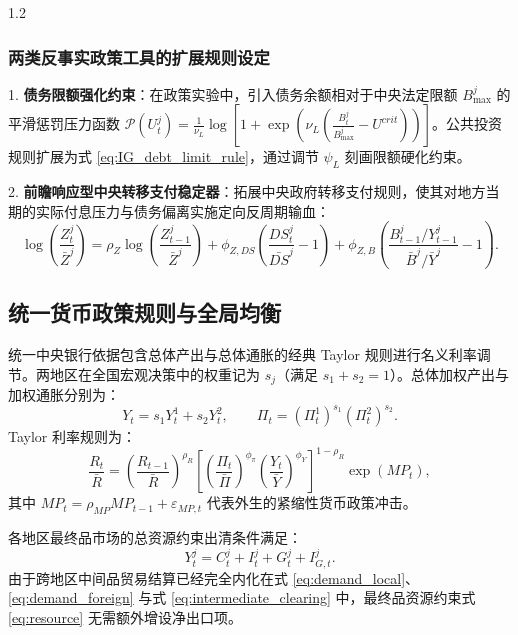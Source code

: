 \documentclass[12pt,UTF8]{ctexart}
\begin{document}
\begin{spacing}{1.2}
		\subsubsection{两类反事实政策工具的扩展规则设定}
		
		1. \textbf{债务限额强化约束}：在政策实验中，引入债务余额相对于中央法定限额 $B_{\max}^j$ 的平滑惩罚压力函数 $\mathcal P(U_t^j) = \frac{1}{\nu_L}\log\left[1+\exp\left(\nu_L(\frac{B_t^j}{B_{\max}^j}-U^{crit})\right)\right]$。公共投资规则扩展为式 \eqref{eq:IG_debt_limit_rule}，通过调节 $\psi_L$ 刻画限额硬化约束。
		
		2. \textbf{前瞻响应型中央转移支付稳定器}：拓展中央政府转移支付规则，使其对地方当期的实际付息压力与债务偏离实施定向反周期输血：
		\begin{equation}
			\log\left(\frac{Z_t^j}{\bar Z^j}\right)=\rho_Z\log\left(\frac{Z_{t-1}^j}{\bar Z^j}\right)
			+\phi_{Z,DS}\left(\frac{DS_t^j}{\bar{DS}^j}-1\right)
			+\phi_{Z,B}\left(\frac{B_{t-1}^j/Y_{t-1}^j}{\bar B^j/\bar Y^j}-1\right).
			\label{eq:Z_rule_ext}
		\end{equation}
		
		\subsection{统一货币政策规则与全局均衡}
		
		统一中央银行依据包含总体产出与总体通胀的经典 Taylor 规则进行名义利率调节。两地区在全国宏观决策中的权重记为 $s_j$（满足 $s_1+s_2=1$）。总体加权产出与加权通胀分别为：
		\begin{equation}
			Y_t=s_1Y_t^1+s_2Y_t^2, \qquad \Pi_t=(\Pi_t^1)^{s_1}(\Pi_t^2)^{s_2}.
		\end{equation}
		Taylor 利率规则为：
		\begin{equation}
			\frac{R_t}{\bar R}
			=\left(\frac{R_{t-1}}{\bar R}\right)^{\rho_R}
			\left[
			\left(\frac{\Pi_t}{\bar\Pi}\right)^{\phi_\pi}
			\left(\frac{Y_t}{\bar Y}\right)^{\phi_Y}
			\right]^{1-\rho_R}
			\exp(MP_t),
			\label{eq:Taylor}
		\end{equation}
		其中 $MP_t = \rho_{MP}MP_{t-1} + \varepsilon_{MP,t}$ 代表外生的紧缩性货币政策冲击。
		
		各地区最终品市场的总资源约束出清条件满足：
		\begin{equation}
			Y_t^j=C_t^j+I_t^j+G_t^j+I_{G,t}^j.
			\label{eq:resource}
		\end{equation}
		由于跨地区中间品贸易结算已经完全内化在式 \eqref{eq:demand_local}、\eqref{eq:demand_foreign} 与式 \eqref{eq:intermediate_clearing} 中，最终品资源约束式 \eqref{eq:resource} 无需额外增设净出口项。
		

\end{spacing}
\end{document}
